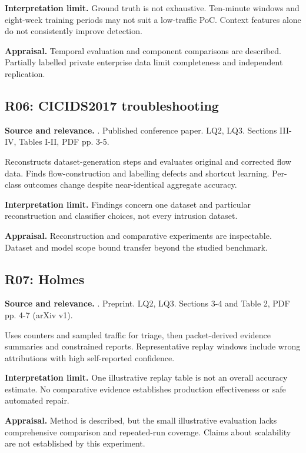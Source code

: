 \noindent\textbf{Interpretation limit.} Ground truth is not exhaustive. Ten-minute windows and eight-week training periods may not suit a low-traffic PoC. Context features alone do not consistently improve detection.

\noindent\textbf{Appraisal.} Temporal evaluation and component comparisons are described. Partially labelled private enterprise data limit completeness and independent replication.

\subsection{R06: CICIDS2017 troubleshooting}
\noindent\textbf{Source and relevance.} \parencite{engelen2021troubleshooting}. Published conference paper. LQ2, LQ3. Sections III-IV, Tables I-II, PDF pp. 3-5.

Reconstructs dataset-generation steps and evaluates original and corrected flow data. Finds flow-construction and labelling defects and shortcut learning. Per-class outcomes change despite near-identical aggregate accuracy.

\noindent\textbf{Interpretation limit.} Findings concern one dataset and particular reconstruction and classifier choices, not every intrusion dataset.

\noindent\textbf{Appraisal.} Reconstruction and comparative experiments are inspectable. Dataset and model scope bound transfer beyond the studied benchmark.

\subsection{R07: Holmes}
\noindent\textbf{Source and relevance.} \parencite{chen2026holmes}. Preprint. LQ2, LQ3. Sections 3-4 and Table 2, PDF pp. 4-7 (arXiv v1).

Uses counters and sampled traffic for triage, then packet-derived evidence summaries and constrained reports. Representative replay windows include wrong attributions with high self-reported confidence.

\noindent\textbf{Interpretation limit.} One illustrative replay table is not an overall accuracy estimate. No comparative evidence establishes production effectiveness or safe automated repair.

\noindent\textbf{Appraisal.} Method is described, but the small illustrative evaluation lacks comprehensive comparison and repeated-run coverage. Claims about scalability are not established by this experiment.

